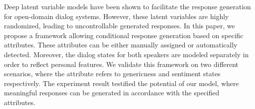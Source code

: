 Deep latent variable models have been shown to facilitate the response generation for open-domain dialog systems. However, these latent variables are highly randomized, leading to uncontrollable generated responses. In this paper, we propose a framework allowing conditional response generation based on specific attributes. These attributes can be either manually assigned or automatically detected. Moreover, the dialog states for both speakers are modeled separately in order to reflect personal features. We validate this framework on two different scenarios, where the attribute refers to genericness and sentiment states respectively. The experiment result testified the potential of our model, where meaningful responses can be generated in accordance with the specified attributes.
